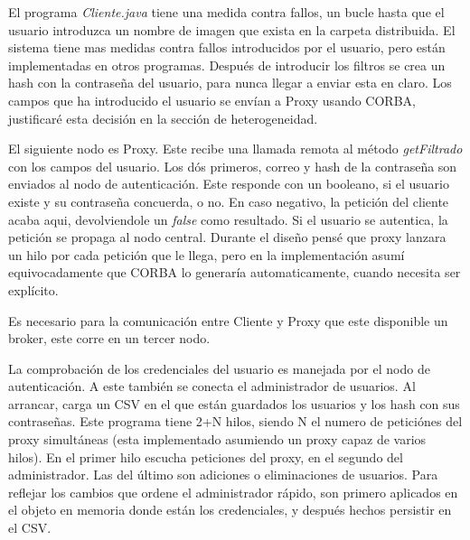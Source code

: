 \documentclass{article}
\begin{document}
\begin{flushleft}
		El programa \textit{Cliente.java} tiene una medida contra fallos, un bucle hasta que el usuario introduzca un nombre de imagen que exista en la carpeta distribuida. El sistema tiene mas medidas contra fallos introducidos por el usuario, pero están implementadas en otros programas. Después de introducir los filtros se crea un hash con la contraseña del usuario, para nunca llegar a enviar esta en claro. Los campos que ha introducido el usuario se envían a Proxy usando CORBA, justificaré esta decisión en la sección de heterogeneidad.
		\linebreak
		 
		El siguiente nodo es Proxy. Este recibe una llamada remota al método \textit{getFiltrado} con los campos del usuario. Los dós primeros, correo y hash de la contraseña son enviados al nodo de autenticación. Este responde con un booleano, si el usuario existe y su contraseña concuerda, o no. En caso negativo, la petición del cliente acaba aqui, devolviendole un \textit{false} como resultado. Si el usuario se autentica, la petición se propaga al nodo central. Durante el diseño pensé que proxy lanzara un hilo por cada petición que le llega, pero en la implementación asumí equivocadamente que CORBA lo generaría automaticamente, cuando necesita ser explícito.
		\linebreak
		
		Es necesario para la comunicación entre Cliente y Proxy que este disponible un broker, este corre en un tercer nodo.
		\linebreak
		
		\hspace*{-1cm}
		
		La comprobación de los credenciales del usuario es manejada por el nodo de autenticación. A este también se conecta el administrador de usuarios. Al arrancar, carga un CSV en el que están guardados los usuarios y los hash con sus contraseñas. Este programa tiene 2+N hilos, siendo N el numero de peticiónes del proxy simultáneas (esta implementado asumiendo un proxy capaz de varios hilos). En el primer hilo escucha peticiones del proxy, en el segundo del administrador. Las del último son adiciones o eliminaciones de usuarios. Para reflejar los cambios que ordene el administrador rápido, son primero aplicados en el objeto en memoria donde están los credenciales, y después hechos persistir en el CSV.
		\linebreak
		

\end{flushleft}
\end{document}
